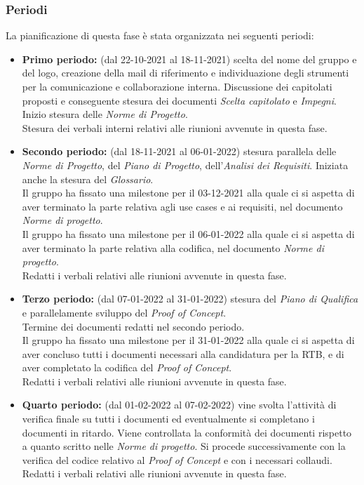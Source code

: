 \subsubsection{Periodi}
La pianificazione di questa fase è stata organizzata nei seguenti periodi:
\begin{itemize}
    \item \textbf{Primo periodo:} (dal 22-10-2021 al 18-11-2021) scelta del nome del gruppo e del logo, creazione della mail di riferimento e individuazione degli strumenti per la comunicazione e collaborazione interna. Discussione dei capitolati proposti e conseguente stesura dei documenti \textit{Scelta capitolato} e \textit{Impegni}. \\
    Inizio stesura delle \textit{Norme di Progetto}.\\
    Stesura dei verbali interni relativi alle riunioni avvenute in questa fase.
    
    \item \textbf{Secondo periodo:} (dal 18-11-2021 al 06-01-2022) stesura parallela delle \textit{Norme di Progetto}, del \textit{Piano di Progetto}, dell'\textit{Analisi dei Requisiti}. Iniziata anche la stesura del \textit{Glossario}.\\
    Il gruppo ha fissato una milestone per il 03-12-2021 alla quale ci si aspetta di aver terminato la parte relativa agli use cases e ai requisiti, nel documento \textit{Norme di progetto}.\\
    Il gruppo ha fissato una milestone per il 06-01-2022 alla quale ci si aspetta di aver terminato la parte relativa alla codifica, nel documento \textit{Norme di progetto}.\\
    Redatti i verbali relativi alle riunioni avvenute in questa fase.
    
    \item \textbf{Terzo periodo:} (dal 07-01-2022 al 31-01-2022) stesura del \textit{Piano di Qualifica} e parallelamente sviluppo del \textit{Proof of Concept}.\\
    Termine dei documenti redatti nel secondo periodo.\\
    Il gruppo ha fissato una milestone per il 31-01-2022 alla quale ci si aspetta di aver concluso tutti i documenti necessari alla candidatura per la RTB, e di aver completato la codifica del \textit{Proof of Concept}.\\
    Redatti i verbali relativi alle riunioni avvenute in questa fase.
    
    \item \textbf{Quarto periodo:} (dal 01-02-2022 al 07-02-2022) vine svolta l'attività di verifica finale su tutti i documenti ed eventualmente si completano i documenti in ritardo. Viene controllata la conformità dei documenti rispetto a quanto scritto nelle \textit{Norme di progetto}.
    Si procede successivamente con la verifica del codice relativo al \textit{Proof of Concept} e con i necessari collaudi.\\
    Redatti i verbali relativi alle riunioni avvenute in questa fase. 
\end{itemize}

